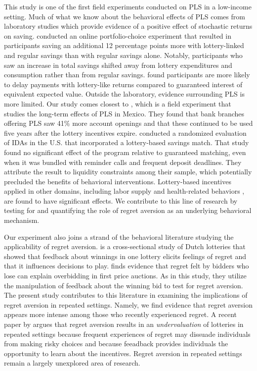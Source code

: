 \documentclass[11pt]{article}
\begin{document}
	This study is one of the first field experiments conducted on PLS in a low-income setting. Much of what we know about the behavioral effects of PLS comes from laboratory studies which provide evidence of a positive effect of stochastic returns on saving. \textcite{atalay_savings_2014} conducted an online portfolio-choice experiment that resulted in participants saving an additional 12 percentage points more with lottery-linked and regular savings than with regular savings alone. Notably, participants who saw an increase in total savings shifted away from lottery expenditures and consumption rather than from regular savings. \textcite{filiz-ozbay_lottery_2015} found participants are more likely to delay payments with lottery-like returns compared to guaranteed interest of equivalent expected value. Outside the laboratory, evidence surrounding PLS is more limited. Our study comes closest to \textcite{gertler_long-term_2017}, which is a field experiment that studies the long-term effects of PLS in Mexico. They found that bank branches offering PLS saw 41\% more account openings and that these continued to be used five years after the lottery incentives expire. \textcite{loibl_testing_2016} conducted a randomized evaluation of IDAs in the U.S. that incorporated a lottery-based savings match. That study found no significant effect of the program relative to guaranteed matching, even when it was bundled with reminder calls and frequent deposit deadlines. They attribute the result to liquidity constraints among their sample, which potentially precluded the benefits of behavioral interventions. Lottery-based incentives applied in other domains, including labor supply \parencite{brune_effect_2015} and health-related behaviors \parencite{kimmel_randomized_2012,bjorkman_nyqvist_using_2015}, are found to have significant effects. We contribute to this line of research by testing for and quantifying the role of regret aversion as an underlying behavioral mechanism.

	Our experiment also joins a strand of the behavioral literature studying the applicability of regret aversion. \parencite{zeelenberg_consequences_2004} is a cross-sectional study of Dutch lotteries that showed that feedback about winnings in one lottery elicits feelings of regret and that it influences decisions to play.  \parencite{filiz-ozbay_auctions_2007} finds evidence that regret felt by bidders who lose can explain overbidding in first price auctions. As in this study, they utilize the manipulation of feedback about the winning bid to test for regret aversion. The present study contributes to this literature in examining the implications of regret aversion in repeated settings. Namely, we find evidence that regret aversion appears more intense among those who recently experienced regret. A recent paper by \textcite{imas_regret_2016} argues that regret aversion results in an \emph{undervaluation} of lotteries in repeated settings because frequent experiences of regret may dissuade individuals from making risky choices and because feeadback provides individuals the opportunity to learn about the incentives. Regret aversion in repeated settings remain a largely unexplored area of research.
\end{document}
